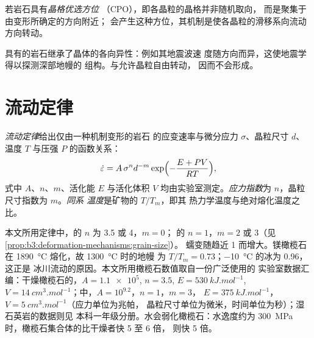 \begin{definition}[晶格优选方位]\label{def:b3:deformation-mechanisms:cpo}
若岩石具有\emph{晶格优选方位}
（CPO），即各晶粒的晶格并非随机取向，
而是聚集于由变形所确定的方向附近；
会产生这种方位，其机制是使各晶粒的滑移系向流动方向转动。
\end{definition}

具有的岩石继承了晶体的各向异性：例如其地震波速
度随方向而异，这使地震学得以探测深部地幔的
组构。与允许晶粒自由转动，
因而不会形成。

\section{流动定律}

\begin{definition}\label{def:b3:deformation-mechanisms:flow-law}
\emph{流动定律}给出仅由一种机制变形的岩石
的应变速率与微分应力 $\sigma$、晶粒尺寸
$d$、温度 $T$ 与压强 $P$ 的函数关系：
\[
  \dot\varepsilon = A\,\sigma^nd^{-m}\exp\Bigl(-\frac{E + PV}{RT}\Bigr),
\]
式中 $A$、$n$、$m$、活化能 $E$ 与活化体积 $V$
均由实验室测定。\emph{应力指数}为
$n$，晶粒尺寸指数为 $m$。\emph{同系
温度}是矿物的 $T/T_m$，即其
热力学温度与绝对熔化温度之比。
\end{definition}

本文所用定律中，的 $n$ 为 3.5 或 4，$m = 0$；
的 $n = 1$，$m = 2$ 或 3（见\cref{prop:b3:deformation-mechanisms:grain-size}）。
蠕变随趋近 1 而增大。镁橄榄石在 \qty{1890}{\celsius} 熔化，故 \qty{1300}{\celsius} 时的地幔
为 $T/T_m = 0.73$；\qty{-10}{\celsius} 的冰为 0.96，这正是
冰川流动的原因。本文所用橄榄石数值取自一份广泛使用的
实验室数据汇编：干燥橄榄石的，$A =
\num{1.1e5}$, $n = 3.5$, $E = \qty{530}{kJ.mol^{-1}}$, $V =
\qty{14}{cm^3.mol^{-1}}$；中，$A = 10^{9.2}$，$n = 1$，$m = 3$，
$E = \qty{375}{kJ.mol^{-1}}$，$V = \qty{5}{cm^3.mol^{-1}}$（应力单位为兆帕，
晶粒尺寸单位为微米，时间单位为秒）；湿石英岩的数据则见
本科一年级分册。水会弱化橄榄石：水逸度约为
\qty{300}{MPa} 时，橄榄石集合体的比干燥者快 5 至 6 倍，
则快 5 倍。

